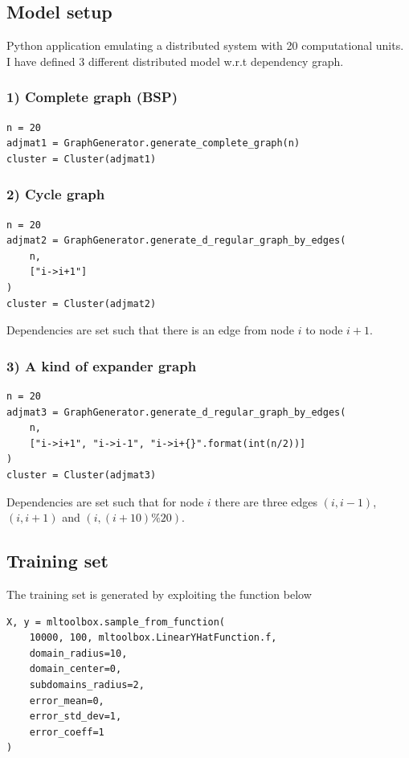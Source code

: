 \documentclass[a4paper,12pt]{article}
\theoremstyle{newplanestyle}
\theoremstyle{newdefinitionstyle}
\theoremstyle{newprovestyle}
\begin{document}
\subsection*{Model setup}
Python application emulating a distributed system with 20 computational units.
\\
I have defined 3 different distributed model w.r.t dependency graph.

\subsubsection*{1) Complete graph (BSP)}
\begin{lstlisting}
n = 20
adjmat1 = GraphGenerator.generate_complete_graph(n)
cluster = Cluster(adjmat1)
\end{lstlisting}
\vspace{1em}

\subsubsection*{2) Cycle graph}
\begin{lstlisting}
n = 20
adjmat2 = GraphGenerator.generate_d_regular_graph_by_edges(
    n,
    ["i->i+1"]
)
cluster = Cluster(adjmat2)
\end{lstlisting}
Dependencies are set such that there is an edge from node $i$ to node $i+1$.
\vspace{2em}


\subsubsection*{3) A kind of expander graph}
\begin{lstlisting}
n = 20
adjmat3 = GraphGenerator.generate_d_regular_graph_by_edges(
    n,
    ["i->i+1", "i->i-1", "i->i+{}".format(int(n/2))]
)
cluster = Cluster(adjmat3)
\end{lstlisting}
Dependencies are set such that for node $i$ there are three edges $(i,i-1)$, $(i,i+1)$ and $(i,(i+10)\%20)$.
\vspace{2em}


\subsection*{Training set}
The training set is generated by exploiting the function below

\begin{lstlisting}
X, y = mltoolbox.sample_from_function(
    10000, 100, mltoolbox.LinearYHatFunction.f,
    domain_radius=10,
    domain_center=0,
    subdomains_radius=2,
    error_mean=0,
    error_std_dev=1,
    error_coeff=1
)
\end{lstlisting}
\end{document}
